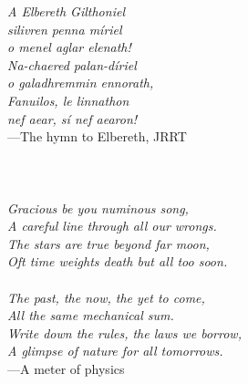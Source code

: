\begin{center}
\emph{
    A Elbereth Gilthoniel\\
    silivren penna míriel\\
    o menel aglar elenath!\\
    Na-chaered palan-díriel\\
    o galadhremmin ennorath,\\
    Fanuilos, le linnathon\\
    nef aear, sí nef aearon!\\
}
---The hymn to Elbereth, JRRT\,\\
\,\\
\,\\
\,\\
\emph{
    Gracious be you numinous song,\\
    A careful line through all our wrongs.\\
    The stars are true beyond far moon,\\
    Oft time weights death but all too soon.\\
    \,\\
    The past, the now, the yet to come,\\
    All the same mechanical sum.\\
    Write down the rules, the laws we borrow,\\
    A glimpse of nature for all tomorrows.\\
}
---A meter of physics\,\\
\end{center}

